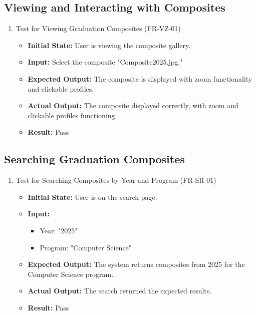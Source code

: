 \documentclass[12pt, titlepage]{article}
\begin{document}
\subsection{Viewing and Interacting with Composites}
\begin{enumerate}
    
    \item Test for Viewing Graduation Composites (FR-VZ-01)
    \begin{itemize}
        \item \textbf{Initial State:} User is viewing the composite gallery.
        \item \textbf{Input:} Select the composite "Composite2025.jpg."
        \item \textbf{Expected Output:} The composite is displayed with zoom functionality and clickable profiles.
        \item \textbf{Actual Output:} The composite displayed correctly, with zoom and clickable profiles functioning.
        \item \textbf{Result:} Pass
    \end{itemize}
\end{enumerate}

\subsection{Searching Graduation Composites}
\begin{enumerate}
    
    \item Test for Searching Composites by Year and Program (FR-SR-01)
    \begin{itemize}
        \item \textbf{Initial State:} User is on the search page.
        \item \textbf{Input:}
        \begin{itemize}
            \item Year: "2025"
            \item Program: "Computer Science"
        \end{itemize}
        \item \textbf{Expected Output:} The system returns composites from 2025 for the Computer Science program.
        \item \textbf{Actual Output:} The search returned the expected results.
        \item \textbf{Result:} Pass
    \end{itemize}
\end{enumerate}
\end{document}
